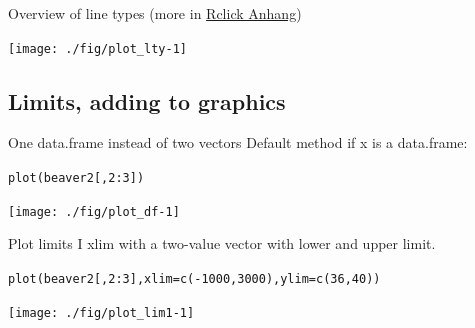 \documentclass[xcolor=table,       handout,    xcolor=dvipsnames]{beamer}\usepackage[]{graphicx}\usepackage[]{color}
\makeatletter
\newcommand{\hlnum}[1]{\textcolor[rgb]{0,0,0}{#1}}
\newcommand{\hlopt}[1]{\textcolor[rgb]{0,0,0}{#1}}
\newcommand{\hlstd}[1]{\textcolor[rgb]{0,0,0}{#1}}
\newcommand{\hlkwc}[1]{\textcolor[rgb]{1,0,1}{#1}}
\newcommand{\hlkwd}[1]{\textcolor[rgb]{0,0,1}{#1}}
\newenvironment{kframe}{%
 \def\at@end@of@kframe{}%
 \ifinner\ifhmode%
  \def\at@end@of@kframe{\end{minipage}}%
  \begin{minipage}{\columnwidth}%
 \fi\fi%
 \def\FrameCommand##1{\hskip\@totalleftmargin \hskip-\fboxsep
 \colorbox{shadecolor}{##1}\hskip-\fboxsep
     \hskip-\linewidth \hskip-\@totalleftmargin \hskip\columnwidth}%
 \MakeFramed {\advance\hsize-\width
   \@totalleftmargin\z@ \linewidth\hsize
   \@setminipage}}%
 {\par\unskip\endMakeFramed%
 \at@end@of@kframe}
\newenvironment{knitrout}{}{} %
\makeatother
\begin{document}

\begin{frame}[fragile]{Overview of line types (more in \href{https://dl.dropboxusercontent.com/u/4836866/Rclick/Anhang.pdf}{Rclick Anhang})}
\begin{knitrout}
\color{fgcolor}

{\centering \texttt{[image: ./fig/plot\_lty-1]} 

}



\end{knitrout}
\end{frame}


\subsection{Limits, adding to graphics}

\begin{frame}[fragile]{One data.frame instead of two vectors}
Default method if x is a data.frame:
\begin{knitrout}
\color{fgcolor}\begin{kframe}
\begin{alltt}
\hlkwd{plot}\hlstd{( beaver2[ ,}\hlnum{2}\hlopt{:}\hlnum{3}\hlstd{] )}
\end{alltt}
\end{kframe}

{\centering \texttt{[image: ./fig/plot\_df-1]} 

}



\end{knitrout}
\end{frame}


\begin{frame}[fragile]{Plot limits I}
xlim with a two-value vector with lower and upper limit.
\begin{knitrout}
\color{fgcolor}\begin{kframe}
\begin{alltt}
\hlkwd{plot}\hlstd{(beaver2[ ,}\hlnum{2}\hlopt{:}\hlnum{3}\hlstd{],} \hlkwc{xlim}\hlstd{=}\hlkwd{c}\hlstd{(}\hlopt{-}\hlnum{1000}\hlstd{,}\hlnum{3000}\hlstd{),}  \hlkwc{ylim}\hlstd{=}\hlkwd{c}\hlstd{(}\hlnum{36}\hlstd{,}\hlnum{40}\hlstd{))}
\end{alltt}
\end{kframe}

{\centering \texttt{[image: ./fig/plot\_lim1-1]} 

}



\end{knitrout}
\end{frame}
\end{document}
